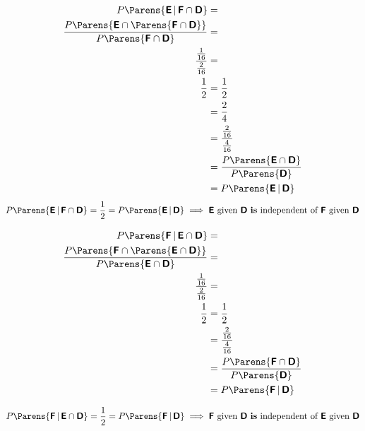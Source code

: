 \documentclass{ProblemSetCUNY}
\newcommand{\?}{\stackrel{?}{=}}
\newcommand{\Prob}[1]{\ensuremath{P\Parens{#1}}\xspace}
\newcommand{\ProbGiven}[2]{\ensuremath{P\Parens{#1\,|\,#2}}\xspace}
\newcommand{\Event}[1]{\ensuremath{\bm{\mathsf{#1}}}\xspace}
\begin{document}
\begin{align*}
\ProbGiven{\Event{E}}{\Event{F}\cap\Event{D}} &=\\
\frac{\Prob{\Event{E} \cap \Parens{\Event{F}\cap\Event{D}}}}{\Prob{\Event{F}\cap\Event{D}}} &=\\
\frac{\frac{1}{16}}{\frac{2}{16}} &=\\
\frac{1}{2} &= \frac{1}{2}\\
&= \frac{2}{4}\\
&=  \frac{\frac{2}{16}}{\frac{4}{16}}\\
&=  \frac{\Prob{\Event{E}\cap\Event{D}}}{\Prob{\Event{D}}}\\
&= \ProbGiven{\Event{E}}{\Event{D}} \\
\end{align*}
\[
\ProbGiven{\Event{E}}{\Event{F}\cap\Event{D}} = \frac{1}{2} = \ProbGiven{\Event{E}}{\Event{D}} \implies \text{\Event{E} given \Event{D} \textbf{is} independent of \Event{F} given \Event{D}}
\]

\begin{align*}
\ProbGiven{\Event{F}}{\Event{E}\cap\Event{D}} &=\\
\frac{\Prob{\Event{F} \cap \Parens{\Event{E}\cap\Event{D}}}}{\Prob{\Event{E}\cap\Event{D}}} &=\\
\frac{\frac{1}{16}}{\frac{2}{16}} &=\\
\frac{1}{2} &=  \frac{1}{2}\\
&=  \frac{\frac{2}{16}}{\frac{4}{16}}\\
&=  \frac{\Prob{\Event{F}\cap\Event{D}}}{\Prob{\Event{D}}}\\
&= \ProbGiven{\Event{F}}{\Event{D}} \\
\end{align*}

\[
\ProbGiven{\Event{F}}{\Event{E}\cap\Event{D}} = \frac{1}{2} = \ProbGiven{\Event{F}}{\Event{D}} \implies \text{\Event{F} given \Event{D} \textbf{is} independent of \Event{E} given \Event{D}}
\]

\newcommand{\Coin}[1]{\ensuremath{\mathcal{C}_{\mathbf{#1}}}}
\end{document}

